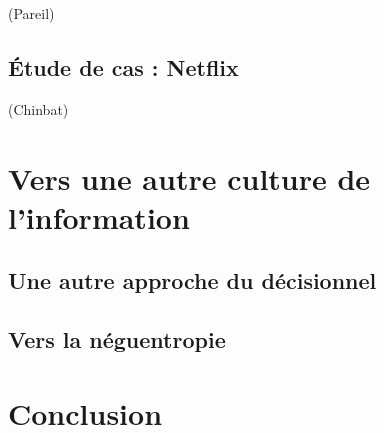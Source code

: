 \documentclass[a4paper,12pt]{report}
\begin{document}
(Pareil)

\section{Étude de cas : Netflix}

(Chinbat)

\chapter{Vers une autre culture de l'information}

\section{Une autre approche du décisionnel}

\section{Vers la néguentropie}

\chapter*{Conclusion}




\newpage
\printglossary
\newpage
\printglossary[type=\acronymtype]
\end{document}
